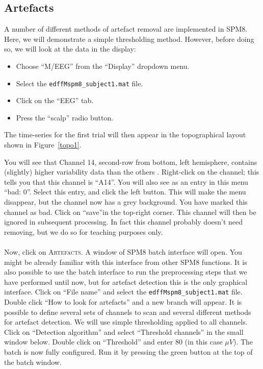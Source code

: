 \subsection{Artefacts}
 A number of different methods of artefact removal are implemented in SPM8. Here, we will demonstrate a simple thresholding method. However, before doing so, we will look at the data in the display:
\begin{itemize}
\item{Choose ``M/EEG'' from the ``Display'' dropdown menu.}
\item{Select the \texttt{edffMspm8\_subject1.mat} file.}
\item{Click on the ``EEG'' tab.}
\item{Press the ``scalp'' radio button.}
\end{itemize}
The time-series for the first trial will then appear in the topographical layout shown in Figure~\ref{topo1}.

 You will see that Channel 14, second-row from bottom, left hemisphere, contains (slightly) higher variability data than the others .
Right-click on the channel; this tells you that this channel is ``A14''. You will also see as an entry in this menu ``bad: 0''. Select this entry, and click the left button. This will make the menu disappear, but the channel now has a grey background. You have marked this channel as bad. Click on ``save''in the top-right corner. This channel will then be ignored in subsequent processing. In fact this channel probably doesn't need removing, but we do so for teaching purposes only.
\\
\\
Now, click on \textsc{Artefacts}. A window of SPM8 batch interface will open. You might be already familiar with this interface from other SPM8 functions. It is also possible to use the batch interface to run the preprocessing steps that we have performed until now, but for artefact detection this is the only graphical interface. Click on ``File name'' and select the \texttt{edffMspm8\_subject1.mat} file.  Double click ``How to look for artefacts'' and a new branch will appear. It is possible to define several sets of channels to scan and several different methods for artefact detection. We will use simple thresholding applied to all channels. Click on ``Detection algorithm'' and select ``Threshold channels'' in the small window below. Double click on ``Threshold'' and enter 80 (in this case $\mu V$). The batch is now fully configured. Run it by pressing the green button at the top of the batch window. 

